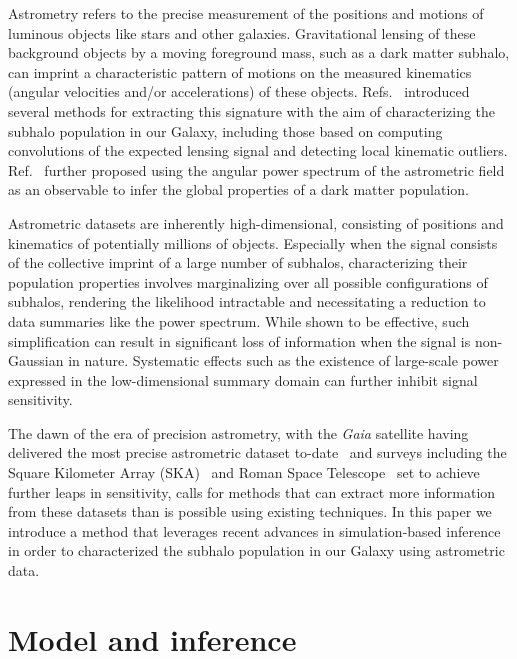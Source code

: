 \documentclass[preprint]{article}
\begin{document}
Astrometry refers to the precise measurement of the positions and motions of luminous objects like stars and other galaxies. Gravitational lensing of these background objects by a moving foreground mass, such as a dark matter subhalo, can imprint a characteristic pattern of motions on the measured kinematics (angular velocities and/or accelerations) of these objects. Refs.~\cite{VanTilburg:2018ykj,Mondino:2020rkn} introduced several methods for extracting this signature with the aim of characterizing the subhalo population in our Galaxy, including those based on computing convolutions of the expected lensing signal and detecting local kinematic outliers. Ref.~\cite{Mishra-Sharma:2020ynk} further proposed using the angular power spectrum of the astrometric field as an observable to infer the global properties of a dark matter population.  %

Astrometric datasets are inherently high-dimensional, consisting of positions and kinematics of potentially millions of objects. Especially when the signal consists of the collective imprint of a large number of subhalos, characterizing their population properties involves marginalizing over all possible configurations of subhalos, rendering the likelihood intractable and necessitating a reduction to data summaries like the power spectrum. While shown to be effective, such simplification can result in significant loss of information when the signal is non-Gaussian in nature. Systematic effects such as the existence of large-scale power expressed in the low-dimensional summary domain can further inhibit signal sensitivity. 

The dawn of the era of precision astrometry, with the \emph{Gaia} satellite having delivered the most precise astrometric dataset to-date~\cite{2016A&A...595A...1G,2018A&A...616A...1G,2018A&A...616A...2L} and surveys including the Square Kilometer Array (SKA)~\cite{Fomalont:2004hr,Jarvis:2015tqa} and Roman Space Telescope~\cite{2019JATIS...5d4005W} set to achieve further leaps in sensitivity, calls for methods that can extract more information from these datasets than is possible using existing techniques. In this paper we introduce a method that leverages recent advances in simulation-based inference %
in order to characterized the subhalo population in our Galaxy using astrometric data.

\section{Model and inference}
\label{sec:model}
\end{document}
